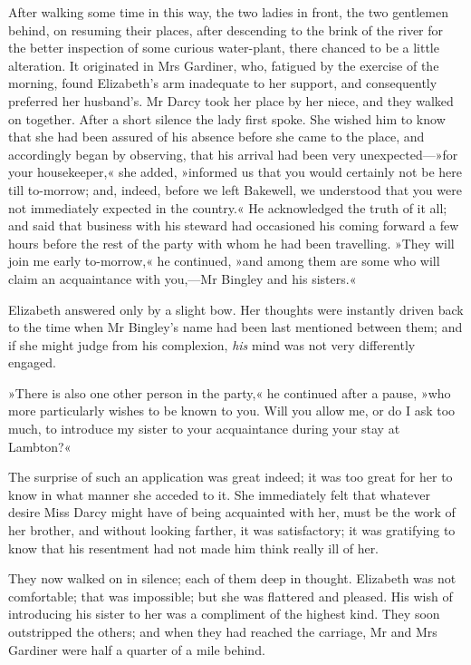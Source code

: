 After walking some time in this way, the two ladies in front, the two gentlemen behind, on resuming their places, after descending to the brink of the river for the better inspection of some curious water-plant, there chanced to be a little alteration. It originated in Mrs Gardiner, who, fatigued by the exercise of the morning, found Elizabeth's arm inadequate to her support, and consequently preferred her husband's. Mr Darcy took her place by her niece, and they walked on together. After a short silence the lady first spoke. She wished him to know that she had been assured of his absence before she came to the place, and accordingly began by observing, that his arrival had been very unexpected—»for your housekeeper,« she added, »informed us that you would certainly not be here till to-morrow; and, indeed, before we left Bakewell, we understood that you were not immediately expected in the country.« He acknowledged the truth of it all; and said that business with his steward had occasioned his coming forward a few hours before the rest of the party with whom he had been travelling. »They will join me early to-morrow,« he continued, »and among them are some who will claim an acquaintance with you,—Mr Bingley and his sisters.«

Elizabeth answered only by a slight bow. Her thoughts were instantly driven back to the time when Mr Bingley's name had been last mentioned between them; and if she might judge from his complexion, \textit{his} mind was not very differently engaged.

»There is also one other person in the party,« he continued after a pause, »who more particularly wishes to be known to you. Will you allow me, or do I ask too much, to introduce my sister to your acquaintance during your stay at Lambton?«

The surprise of such an application was great indeed; it was too great for her to know in what manner she acceded to it. She immediately felt that whatever desire Miss Darcy might have of being acquainted with her, must be the work of her brother, and without looking farther, it was satisfactory; it was gratifying to know that his resentment had not made him think really ill of her.

They now walked on in silence; each of them deep in thought. Elizabeth was not comfortable; that was impossible; but she was flattered and pleased. His wish of introducing his sister to her was a compliment of the highest kind. They soon outstripped the others; and when they had reached the carriage, Mr and Mrs Gardiner were half a quarter of a mile behind.

